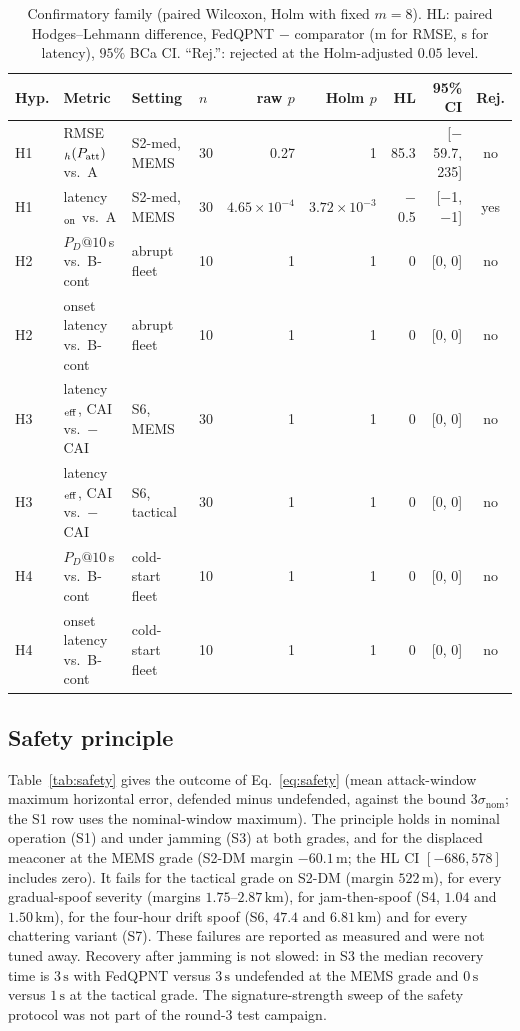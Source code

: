 \documentclass[12pt,a4paper]{article}
\begin{document}
\begin{table}[ht]
\centering
\caption{Confirmatory family (paired Wilcoxon, Holm with fixed $m=8$). HL: paired Hodges--Lehmann difference, FedQPNT $-$ comparator (m for RMSE, s for latency), $95\%$ BCa CI. ``Rej.'': rejected at the Holm-adjusted $0.05$ level.}
\label{tab:conf}
\scriptsize
\setlength{\tabcolsep}{3pt}
\begin{tabular}{llllrrrrc}
\toprule
Hyp. & Metric & Setting & $n$ & raw $p$ & Holm $p$ & HL & 95\% CI & Rej. \\
\midrule
H1 & RMSE$_h(P_{\rm att})$ vs.\ A & S2-med, MEMS & 30 & 0.27 & 1 & 85.3 & [$-$59.7, 235] & no \\
H1 & latency$_{\rm on}$ vs.\ A & S2-med, MEMS & 30 & $4.65\times10^{-4}$ & $3.72\times10^{-3}$ & $-$0.5 & [$-$1, $-$1] & yes \\
H2 & $P_D@10$\,s vs.\ B-cont & abrupt fleet & 10 & 1 & 1 & 0 & [0, 0] & no \\
H2 & onset latency vs.\ B-cont & abrupt fleet & 10 & 1 & 1 & 0 & [0, 0] & no \\
H3 & latency$_{\rm eff}$, CAI vs.\ $-$CAI & S6, MEMS & 30 & 1 & 1 & 0 & [0, 0] & no \\
H3 & latency$_{\rm eff}$, CAI vs.\ $-$CAI & S6, tactical & 30 & 1 & 1 & 0 & [0, 0] & no \\
H4 & $P_D@10$\,s vs.\ B-cont & cold-start fleet & 10 & 1 & 1 & 0 & [0, 0] & no \\
H4 & onset latency vs.\ B-cont & cold-start fleet & 10 & 1 & 1 & 0 & [0, 0] & no \\
\bottomrule
\end{tabular}
\end{table}

\subsection{Safety principle}
Table~\ref{tab:safety} gives the outcome of Eq.~\eqref{eq:safety} (mean attack-window maximum horizontal error, defended minus undefended, against the bound $3\sigma_{\mathrm{nom}}$; the S1 row uses the nominal-window maximum). The principle holds in nominal operation (S1) and under jamming (S3) at both grades, and for the displaced meaconer at the MEMS grade (S2-DM margin $-60.1\,\mathrm{m}$; the HL CI $[-686,578]$ includes zero). It fails for the tactical grade on S2-DM (margin $522\,\mathrm{m}$), for every gradual-spoof severity (margins $1.75$--$2.87\,\mathrm{km}$), for jam-then-spoof (S4, $1.04$ and $1.50\,\mathrm{km}$), for the four-hour drift spoof (S6, $47.4$ and $6.81\,\mathrm{km}$) and for every chattering variant (S7). These failures are reported as measured and were not tuned away. Recovery after jamming is not slowed: in S3 the median recovery time is $3\,\mathrm{s}$ with FedQPNT versus $3\,\mathrm{s}$ undefended at the MEMS grade and $0\,\mathrm{s}$ versus $1\,\mathrm{s}$ at the tactical grade. The signature-strength sweep of the safety protocol was not part of the round-3 test campaign.
\end{document}
